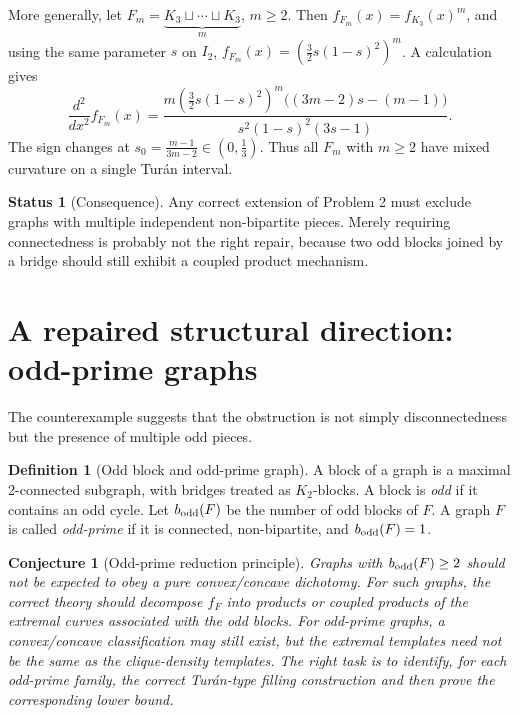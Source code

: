 \documentclass[11pt]{amsart}
\newtheorem{conjecture}[theorem]{Conjecture}
\theoremstyle{definition}
\newtheorem{definition}[theorem]{Definition}
\newtheorem{status}[theorem]{Status}
\newcommand{\1}{\mathbf 1}
\begin{document}
More generally, let $F_m=\underbrace{K_3\sqcup\cdots\sqcup K_3}_{m}$, $m\ge 2$.
Then $f_{F_m}(x)=f_{K_3}(x)^m$, and using the same parameter $s$ on $I_2$,
$f_{F_m}(x)=\left(\frac32s(1-s)^2\right)^m$.  A calculation gives
\[
   \frac{d^2}{dx^2}f_{F_m}(x)
   =
   \frac{m\left(\frac32s(1-s)^2\right)^m
     \bigl((3m-2)s-(m-1)\bigr)}
        {s^2(1-s)^2(3s-1)}.
\]
The sign changes at $s_0=\frac{m-1}{3m-2}\in\left(0,\frac13\right)$.  Thus all
$F_m$ with $m\ge 2$ have mixed curvature on a single Tur\'an interval.

\begin{status}[Consequence]
Any correct extension of Problem 2 must exclude graphs with multiple independent
non-bipartite pieces.  Merely requiring connectedness is probably not the right
repair, because two odd blocks joined by a bridge should still exhibit a coupled
product mechanism.
\end{status}

\section{A repaired structural direction: odd-prime graphs}
\label{sec:oddprime}

The counterexample suggests that the obstruction is not simply disconnectedness
but the presence of multiple odd pieces.

\begin{definition}[Odd block and odd-prime graph]
A block of a graph is a maximal $2$-connected subgraph, with bridges treated as
$K_2$-blocks.  A block is \emph{odd} if it contains an odd cycle.  Let
$b_{\rm odd}(F)$ be the number of odd blocks of $F$.  A graph $F$ is called
\emph{odd-prime} if it is connected, non-bipartite, and $b_{\rm odd}(F)=1$.
\end{definition}

\begin{conjecture}[Odd-prime reduction principle]
Graphs with $b_{\rm odd}(F)\ge 2$ should not be expected to obey a pure
convex/concave dichotomy.  For such graphs, the correct theory should decompose
$f_F$ into products or coupled products of the extremal curves associated with
the odd blocks.  For odd-prime graphs, a convex/concave classification may still
exist, but the extremal templates need not be the same as the clique-density
templates.  The right task is to identify, for each odd-prime family, the
correct Tur\'an-type filling construction and then prove the corresponding lower
bound.
\end{conjecture}
\end{document}
